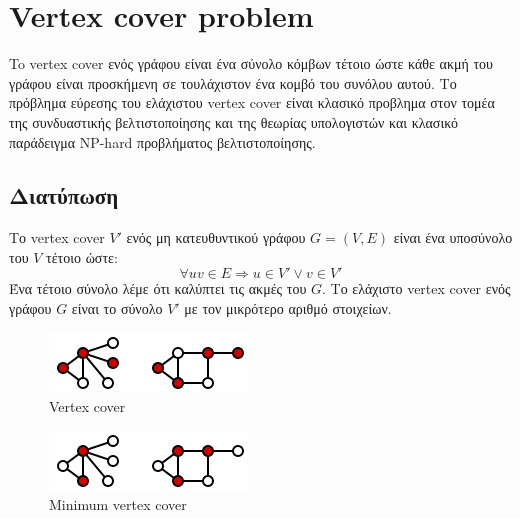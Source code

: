 \chapter{Vertex cover problem} %

\label{Chapter2} %
\justify
To vertex cover ενός γράφου είναι ένα σύνολο κόμβων τέτοιο ώστε κάθε ακμή του γράφου είναι προσκήμενη σε τουλάχιστον ένα κομβό του συνόλου αυτού. Το πρόβλημα εύρεσης του ελάχιστου vertex cover είναι κλασικό προβλημα στον τομέα της συνδυαστικής βελτιστοποίησης και της θεωρίας υπολογιστών και κλασικό παράδειγμα NP-hard προβλήματος βελτιστοποίησης. 

\section{Διατύπωση}
Το vertex cover $V'$ ενός μη κατευθυντικού γράφου $G=(V,E)$ είναι ένα υποσύνολο του $V$ τέτοιο ώστε:
$$\forall uv \in{E} \Rightarrow u \in{V'} \lor v \in{V'}$$
Ένα τέτοιο σύνολο λέμε ότι καλύπτει τις ακμές του $G$. Το ελάχιστο vertex cover ενός γράφου $G$ είναι το σύνολο $V'$ με τον μικρότερο αριθμό στοιχείων.


\begin{figure}[H]
\caption{Vertex cover}
\centering
\includegraphics{Figures/vert_cover.png}\centering
\end{figure}

\begin{figure}[H]
\caption{Minimum vertex cover}
\centering
\includegraphics{Figures/min_vert_cover.png}\centering
\end{figure}


